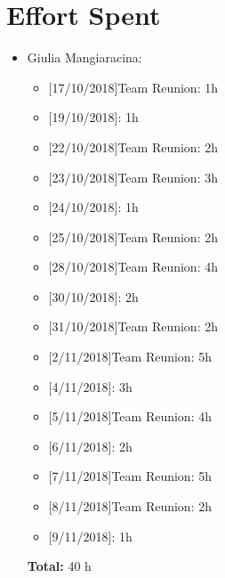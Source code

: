 \chapter{Effort Spent}

\begin{itemize}
\item Giulia Mangiaracina: 
\begin{itemize}
    \item {[}17/10/2018{]}Team Reunion: 1h
    \item {[}19/10/2018{]}: 1h
    \item {[}22/10/2018{]}Team Reunion: 2h
    \item {[}23/10/2018{]}Team Reunion: 3h
    \item {[}24/10/2018{]}: 1h
    \item {[}25/10/2018{]}Team Reunion: 2h
    \item {[}28/10/2018{]}Team Reunion: 4h
    \item {[}30/10/2018{]}: 2h
    \item {[}31/10/2018{]}Team Reunion: 2h
    \item {[}2/11/2018{]}Team Reunion:  5h
    \item {[}4/11/2018{]}: 3h
    \item {[}5/11/2018{]}Team Reunion:  4h
    \item {[}6/11/2018{]}: 2h
    \item {[}7/11/2018{]}Team Reunion: 5h
    \item {[}8/11/2018{]}Team Reunion: 2h
    \item {[}9/11/2018{]}: 1h
\end{itemize}
\textbf{Total:} 40 h










\end{itemize}
